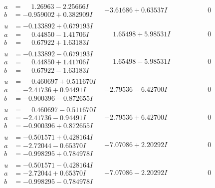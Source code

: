 \documentclass[1p]{elsarticle_modified}
\theoremstyle{definition}
\begin{document}
$$\begin{array}{c|c|c}
\begin{aligned}
a &= \phantom{-}1.26963 - 2.25666 I \\
b &= -0.959002 + 0.382909 I\end{aligned}
 & -3.61686 + 0.63537 I & \phantom{-0.000000 } 0 \\ \hline\begin{aligned}
u &= -0.133892 + 0.679193 I \\
a &= \phantom{-}0.44850 - 1.41706 I \\
b &= \phantom{-}0.67922 + 1.63183 I\end{aligned}
 & \phantom{-}1.65498 + 5.98531 I & \phantom{-0.000000 } 0 \\ \hline\begin{aligned}
u &= -0.133892 - 0.679193 I \\
a &= \phantom{-}0.44850 + 1.41706 I \\
b &= \phantom{-}0.67922 - 1.63183 I\end{aligned}
 & \phantom{-}1.65498 - 5.98531 I & \phantom{-0.000000 } 0 \\ \hline\begin{aligned}
u &= \phantom{-}0.460697 + 0.511670 I \\
a &= -2.41736 + 0.94491 I \\
b &= -0.900396 - 0.872655 I\end{aligned}
 & -2.79536 - 6.42700 I & \phantom{-0.000000 } 0 \\ \hline\begin{aligned}
u &= \phantom{-}0.460697 - 0.511670 I \\
a &= -2.41736 - 0.94491 I \\
b &= -0.900396 + 0.872655 I\end{aligned}
 & -2.79536 + 6.42700 I & \phantom{-0.000000 } 0 \\ \hline\begin{aligned}
u &= -0.501571 + 0.428164 I \\
a &= -2.72044 - 0.65370 I \\
b &= -0.998295 + 0.784978 I\end{aligned}
 & -7.07086 + 2.20292 I & \phantom{-0.000000 } 0 \\ \hline\begin{aligned}
u &= -0.501571 - 0.428164 I \\
a &= -2.72044 + 0.65370 I \\
b &= -0.998295 - 0.784978 I\end{aligned}
 & -7.07086 - 2.20292 I & \phantom{-0.000000 } 0 \\ \hline\begin{aligned}

\end{aligned}
\end{array}$$
\end{document}
